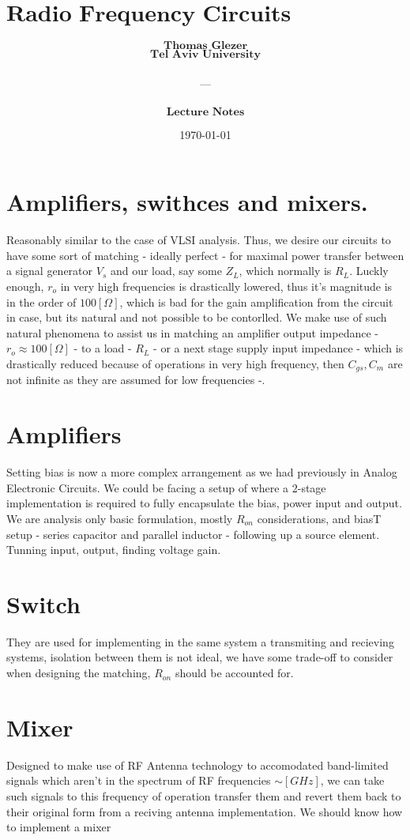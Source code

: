 \documentclass[12pt, letterpaper]{article}
\title{
  \Large $\textbf{Radio Frequency Circuits \& Antenna}$
}
\author{
  $\textbf{Thomas Glezer}$\\
  $\textbf{Tel Aviv University}$\\\\
  ---\\\\
  $\textbf{Lecture Notes}$\\
}
\date{\today}
\begin{document}
\begin{titlingpage}
  \maketitle
\end{titlingpage}

\pagebreak

\section{Amplifiers, swithces and mixers.}

Reasonably similar to the case of VLSI analysis. Thus, we desire our circuits to have some sort of matching - ideally perfect - for maximal power transfer between a signal generator $V_s$ and our load, say some $Z_L$, which normally is $R_L$. Luckly enough, $r_o$ in very high frequencies is drastically lowered, thus it's magnitude is in the order of $100[\Omega]$, which is bad for the gain amplification from the circuit in case, but its natural and not possible to be contorlled. We make use of such natural phenomena to assist us in matching an amplifier output impedance - $r_o\approx100[\Omega]$ - to a load - $R_L$ - or a next stage supply input impedance - which is drastically reduced because of operations in very high frequency, then $C_{gs}, C_{m}$  are not infinite as they are assumed for low frequencies -.

\section{Amplifiers}

Setting bias is now a more complex arrangement as we had previously in Analog Electronic Circuits. We could be facing a setup of where a 2-stage implementation is required to fully encapsulate the bias, power input and output. We are analysis only basic formulation, mostly $R_{on}$ considerations, and biasT setup - series capacitor and parallel inductor - following up a source element. Tunning input, output, finding voltage gain.

\section{Switch}

They are used for implementing in the same system a transmiting and recieving systems, isolation between them is not ideal, we have some trade-off to consider when designing the matching, $R_{on}$ should be accounted for.

\section{Mixer}

Designed to make use of RF Antenna technology to accomodated band-limited signals which aren't in the spectrum of RF frequencies $\sim [GHz]$, we can take such signals to this frequency of operation transfer them and revert them back to their original form from a reciving antenna implementation. We should know how to implement a mixer
\end{document}
